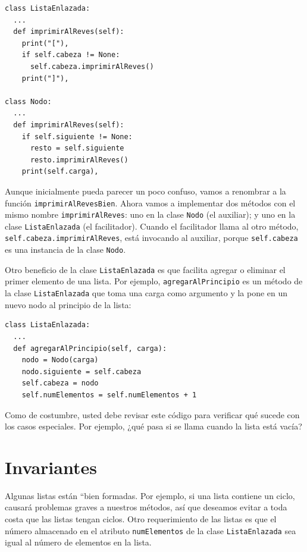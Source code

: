 \beforeverb 
\begin{verbatim}
class ListaEnlazada:
  ...
  def imprimirAlReves(self):
    print("["),
    if self.cabeza != None:
      self.cabeza.imprimirAlReves()
    print("]"),

class Nodo:
  ...
  def imprimirAlReves(self):
    if self.siguiente != None:
      resto = self.siguiente
      resto.imprimirAlReves()
    print(self.carga),
\end{verbatim}
\afterverb Aunque inicialmente pueda parecer un poco confuso, vamos
a renombrar a la función \texttt{imprimirAlRevesBien}. Ahora vamos
a implementar dos métodos con el mismo nombre \texttt{imprimirAlReves}:
uno en la clase \texttt{Nodo} (el auxiliar); y uno en la clase \texttt{ListaEnlazada}
(el facilitador). Cuando el facilitador llama al otro método, \texttt{self.cabeza.imprimirAlReves},
está invocando al auxiliar, porque \texttt{self.cabeza} es una instancia
de la clase \texttt{Nodo}.

Otro beneficio de la clase \texttt{ListaEnlazada} es que facilita
agregar o eliminar el primer elemento de una lista. Por ejemplo, \texttt{agregarAlPrincipio}
es un método de la clase \texttt{ListaEnlazada} que toma una carga
como argumento y la pone en un nuevo nodo al principio de la lista:

\beforeverb 
\begin{verbatim}
class ListaEnlazada:
  ...
  def agregarAlPrincipio(self, carga):
    nodo = Nodo(carga)
    nodo.siguiente = self.cabeza
    self.cabeza = nodo
    self.numElementos = self.numElementos + 1
\end{verbatim}
\afterverb Como de costumbre, usted debe revisar este código para
verificar qué sucede con los casos especiales. Por ejemplo, ¿qué pasa
si se llama cuando la lista está vacía?

\section{Invariantes}

  

Algunas listas están ``bien formadas\textquotedbl{}. Por ejemplo,
si una lista contiene un ciclo, causará problemas graves a nuestros
métodos, así que deseamos evitar a toda costa que las listas tengan
ciclos. Otro requerimiento de las listas es que el número almacenado
en el atributo \texttt{numElementos} de la clase \texttt{ListaEnlazada}
sea igual al número de elementos en la lista.


